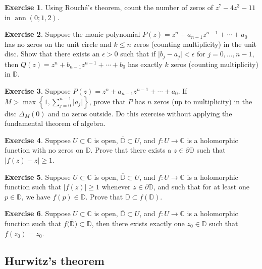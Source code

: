 \documentclass[12pt,openany]{book}
\newcommand{\ann}{\operatorname{ann}}
\newcommand{\sabs}[1]{\lvert {#1} \rvert}
\newcommand{\C}{{\mathbb{C}}}
\newcommand{\D}{{\mathbb{D}}}
\theoremstyle{plain}
\theoremstyle{remark}
\theoremstyle{definition}
\newenvironment{exbox}{%
    \def\FrameCommand{\vrule width 1pt \relax\hspace{10pt}}%
    \MakeFramed{\advance\hsize-\width\FrameRestore}%
}{%
    \endMakeFramed
}
\theoremstyle{exercise}
\newtheorem{exercise}{Exercise}[section]
\theoremstyle{example}
\begin{document}
\begin{exbox}
\begin{exercise}
Using Rouch\'e's theorem, count the number of zeros of $z^7-4z^3-11$ in $\ann(0;1,2)$.
\end{exercise}

\begin{exercise}
Suppose 
the monic polynomial
$P(z) = z^n + a_{n-1} z^{n-1} + \cdots + a_0$
has no zeros on the unit circle and $k \leq n$ zeros
(counting multiplicity)
in the unit disc.  Show that there exists an $\epsilon > 0$ such that
if $\sabs{b_j-a_j} < \epsilon$ for $j=0,\ldots,n-1$, then
$Q(z) = z^n + b_{n-1} z^{n-1} + \cdots + b_0$ has
exactly $k$ zeros (counting multiplicity) in $\D$.
\end{exercise}

\begin{exercise}
Suppose 
$P(z) = z^n + a_{n-1} z^{n-1} + \cdots + a_0$.
If $M > \max\left\{ 1, \sum_{j=0}^{n-1} \sabs{a_j} \right\}$,
prove that $P$ has $n$ zeros (up to multiplicity) in the disc $\Delta_M(0)$
and no zeros outside.  Do this exercise without applying the fundamental theorem of
algebra.
\end{exercise}

\begin{exercise}
Suppose $U \subset \C$ is open, $\overline{\D} \subset U$,
and $f \colon U \to \C$ is a holomorphic function with no zeros on
$\D$.  Prove that there exists a $z \in \partial \D$
such that $\sabs{f(z)-z} \geq 1$.
\end{exercise}

\begin{exercise}
Suppose $U \subset \C$ is open, $\overline{\D} \subset U$,
and $f \colon U \to \C$ is a holomorphic function such
that $\sabs{f(z)} \geq 1$ whenever $z \in \partial \D$,
and such that for at least one $p \in \D$, we have $f(p) \in \D$.
Prove that $\D \subset f(\D)$.
\end{exercise}

\begin{exercise}
Suppose $U \subset \C$ is open, $\overline{\D} \subset U$,
and $f \colon U \to \C$ is a holomorphic function such
that $f\bigl(\overline{\D}\bigr) \subset \D$, then there exists
exactly one $z_0 \in \D$ such that $f(z_0) = z_0$.
\end{exercise}
\end{exbox}

\subsection{Hurwitz's theorem}
\end{document}

